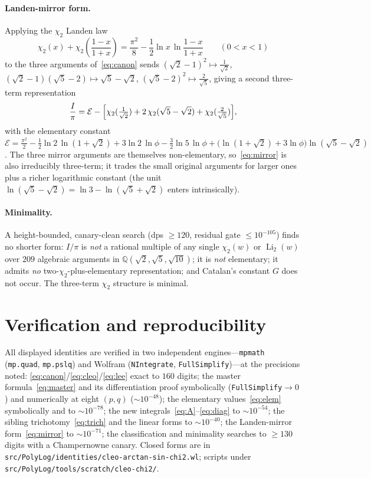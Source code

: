 \documentclass[11pt]{article}
\DeclareMathOperator{\Li}{Li}
\newcommand{\chitwo}{\chi_{2}}
\theoremstyle{plain}\newtheorem{theorem}{Theorem}\newtheorem{proposition}[theorem]{Proposition}
\theoremstyle{remark}\newtheorem{remark}[theorem]{Remark}
\begin{document}
\paragraph{Landen-mirror form.} Applying the $\chitwo$ Landen law
\begin{equation}\label{eq:landen}
  \chitwo(x)+\chitwo\!\left(\frac{1-x}{1+x}\right)=\frac{\pi^2}{8}-\frac12\ln x\,\ln\frac{1-x}{1+x}
  \qquad(0<x<1)
\end{equation}
to the three arguments of~\eqref{eq:canon} sends $(\sqrt2-1)^2\mapsto\tfrac1{\sqrt2}$,
$(\sqrt2-1)(\sqrt5-2)\mapsto\sqrt5-\sqrt2$, $(\sqrt5-2)^2\mapsto\tfrac2{\sqrt5}$, giving a second three-term
representation
\begin{equation}\label{eq:mirror}
  \frac{I}{\pi}=\mathcal E-\Bigl[\chitwo(\tfrac1{\sqrt2})+2\,\chitwo(\sqrt5-\sqrt2)+\chitwo(\tfrac2{\sqrt5})\Bigr],
\end{equation}
with the elementary constant
$\mathcal E=\frac{\pi^2}{2}-\frac12\ln2\,\ln(1+\sqrt2)+3\ln2\,\ln\phi-\frac32\ln5\,\ln\phi
+\bigl(\ln(1+\sqrt2)+3\ln\phi\bigr)\ln(\sqrt5-\sqrt2)$. The three mirror arguments are themselves
non-elementary, so~\eqref{eq:mirror} is also irreducibly three-term; it trades the small original
arguments for larger ones plus a richer logarithmic constant (the unit $\ln(\sqrt5-\sqrt2)=\ln3-\ln(\sqrt5+\sqrt2)$
enters intrinsically).
\paragraph{Minimality.} A height-bounded, canary-clean search (dps $\ge120$, residual gate
$\le10^{-105}$) finds no shorter form: $I/\pi$ is \emph{not} a rational multiple of any single $\chitwo(w)$
or $\Li_2(w)$ over $209$ algebraic arguments in $\mathbb Q(\sqrt2,\sqrt5,\sqrt{10})$; it is \emph{not}
elementary; it admits \emph{no} two-$\chitwo$-plus-elementary representation; and Catalan's constant $G$
does not occur. The three-term $\chitwo$ structure is minimal.

\section{Verification and reproducibility}
All displayed identities are verified in two independent engines---\texttt{mpmath} (\texttt{mp.quad},
\texttt{mp.pslq}) and Wolfram (\texttt{NIntegrate}, \texttt{FullSimplify})---at the precisions noted:
\eqref{eq:canon}/\eqref{eq:cleo}/\eqref{eq:lee} exact to $160$ digits; the master formula~\eqref{eq:master}
and its differentiation proof symbolically (\texttt{FullSimplify}$\to0$) and numerically at eight $(p,q)$
($\sim10^{-48}$); the elementary values~\eqref{eq:elem} symbolically and to $\sim10^{-78}$; the new
integrals~\eqref{eq:A}--\eqref{eq:diag} to $\sim10^{-54}$; the sibling trichotomy~\eqref{eq:trich} and the
linear forms to $\sim10^{-40}$; the Landen-mirror form~\eqref{eq:mirror} to $\sim10^{-71}$; the
classification and minimality searches to $\ge130$ digits with a Champernowne canary. Closed forms are in
\texttt{src/PolyLog/identities/cleo-arctan-sin-chi2.wl}; scripts under
\texttt{src/PolyLog/tools/scratch/cleo-chi2/}.
\end{document}
